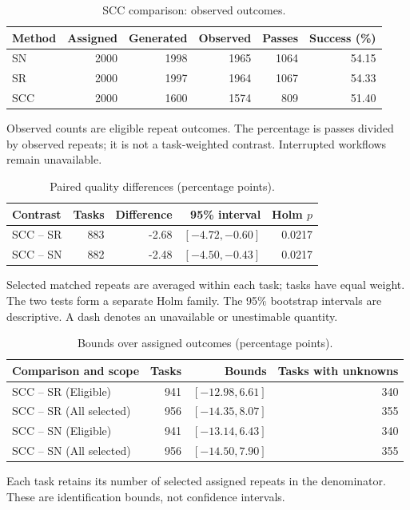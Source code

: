 \begin{table}[htbp]\centering\small
\caption{SCC comparison: observed outcomes.}
\label{tab:scc2000-quality}
\begin{tabular}{lrrrrr}\toprule
Method & Assigned & Generated & Observed & Passes & Success (\%)\\\midrule
SN & 2000 & 1998 & 1965 & 1064 & 54.15\\
SR & 2000 & 1997 & 1964 & 1067 & 54.33\\
SCC & 2000 & 1600 & 1574 & 809 & 51.40\\
\bottomrule\end{tabular}
\par\smallskip\noindent Observed counts are eligible repeat outcomes. The percentage is passes divided by observed repeats; it is not a task-weighted contrast. Interrupted workflows remain unavailable.
\end{table}

\begin{table}[htbp]\centering\small
\caption{Paired quality differences (percentage points).}
\label{tab:scc2000-contrasts}
\begin{tabular}{lrrrr}\toprule
Contrast & Tasks & Difference & 95\% interval & Holm $p$\\\midrule
SCC -- SR & 883 & -2.68 & $[-4.72, -0.60]$ & 0.0217\\
SCC -- SN & 882 & -2.48 & $[-4.50, -0.43]$ & 0.0217\\
\bottomrule\end{tabular}
\par\smallskip\noindent Selected matched repeats are averaged within each task; tasks have equal weight. The two tests form a separate Holm family. The 95\% bootstrap intervals are descriptive. A dash denotes an unavailable or unestimable quantity.
\end{table}

\begin{table}[htbp]\centering\small
\caption{Bounds over assigned outcomes (percentage points).}
\label{tab:scc2000-bounds}
\begin{tabular}{lrrr}\toprule
Comparison and scope & Tasks & Bounds & Tasks with unknowns\\\midrule
SCC -- SR (Eligible) & 941 & $[-12.98, 6.61]$ & 340\\
SCC -- SR (All selected) & 956 & $[-14.35, 8.07]$ & 355\\
SCC -- SN (Eligible) & 941 & $[-13.14, 6.43]$ & 340\\
SCC -- SN (All selected) & 956 & $[-14.50, 7.90]$ & 355\\
\bottomrule\end{tabular}
\par\smallskip\noindent Each task retains its number of selected assigned repeats in the denominator. These are identification bounds, not confidence intervals.
\end{table}

